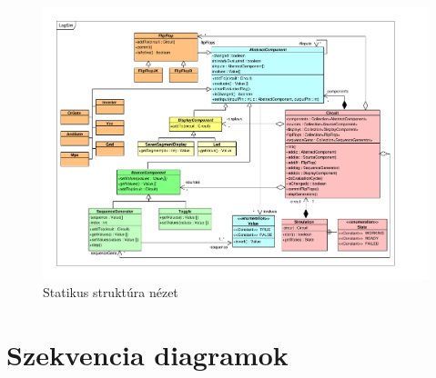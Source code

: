 \begin{figure}[H]
\begin{center}
\includegraphics*[angle=90, width=16.5cm, viewport = 30 30 770 565]{chapters/chapter04/classdiagram/class.pdf}
\caption{Statikus struktúra nézet}
\label{fig:class_diagram}
\end{center}
\end{figure}
%
%
%

\section{Szekvencia diagramok}

